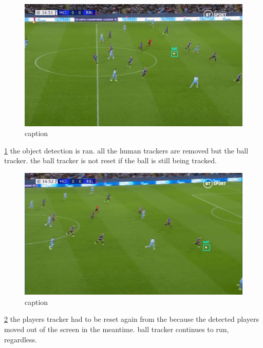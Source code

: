 \documentclass[
11pt,
twoside
]{report}
\begin{document}
\begin{figure}[H]
    \includegraphics[keepaspectratio, width=\columnwidth]{Screenshot_2022-03-03_23-05-49.png}
    \caption{caption}
    \label{img:7}
\end{figure}
\ref{img:7} the object
detection is ran. all the human trackers are removed but the ball
tracker. the ball tracker is not reset if the ball is still being
tracked.

\begin{figure}[H]
    \includegraphics[keepaspectratio, width=\columnwidth]{Screenshot_2022-03-03_23-06-03.png}
    \caption{caption}
    \label{img:8}
\end{figure}
\ref{img:8} the
players tracker had to be reset again from the because the detected
players moved out of the screen in the meantime. ball tracker continues
to run, regardless.
\end{document}
